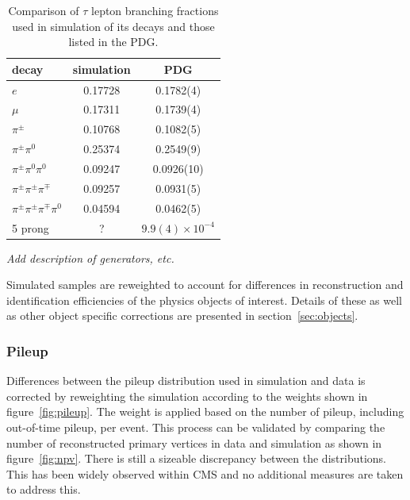 \begin{table}[h]
    \centering
    \begin{tabular}{l|cc}
        decay                                & simulation & PDG       \\
        \hline
        $e$                                  & 0.17728    & 0.1782(4) \\
        $\mu$                                & 0.17311    & 0.1739(4) \\
        $\pi^{\pm}$                          & 0.10768    & 0.1082(5) \\
        $\pi^{\pm}\pi^{0}$                   & 0.25374    & 0.2549(9) \\
        $\pi^{\pm}\pi^{0}\pi^{0}$            & 0.09247    & 0.0926(10) \\
        $\pi^{\pm}\pi^{\pm}\pi^{\mp}$        & 0.09257    & 0.0931(5) \\
        $\pi^{\pm}\pi^{\pm}\pi^{\mp}\pi^{0}$ & 0.04594    & 0.0462(5) \\
        5 prong                              & ?          & $9.9(4)\times 10^{-4}$ \\
    \end{tabular}
    \caption{Comparison of $\tau$ lepton branching fractions used in
    simulation of its decays and those listed in the PDG.}
\end{table}

\emph{Add description of generators, etc.}

Simulated samples are reweighted to account for differences in
reconstruction and identification efficiencies of the physics objects of
interest.  Details of these as well as other object specific corrections 
are presented in section~\ref{sec:objects}.

\subsubsection{Pileup}
\label{sec:pileup}

Differences between the pileup distribution used in simulation and data
is corrected by reweighting the simulation according to the weights
shown in figure~\ref{fig:pileup}.  The weight is applied based on the
number of pileup, including out-of-time pileup, per event.  This process
can be validated by comparing the number of reconstructed primary
vertices in data and simulation as shown in figure~\ref{fig:npv}.  There
is still a sizeable discrepancy between the distributions.  This has
been widely observed within CMS and no additional measures are taken to
address this.


